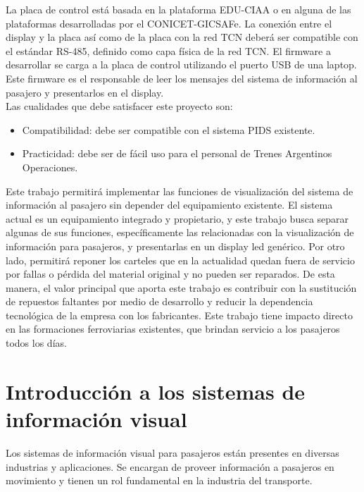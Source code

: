 La placa de control está basada en la plataforma EDU-CIAA \citep{proyecto-ciaa} o en alguna de las plataformas desarrolladas por el CONICET-GICSAFe. La conexión entre el display y la placa así como de la placa con la red TCN deberá ser compatible con el estándar RS-485, definido como capa física de la red TCN. El
firmware a desarrollar se carga a la placa de control utilizando el puerto USB de una laptop. Este firmware es el responsable de leer los mensajes del sistema de información al pasajero y presentarlos en el display.\\

Las cualidades que debe satisfacer este proyecto son:
\begin{itemize}
\item Compatibilidad: debe ser compatible con el sistema PIDS existente.
\item Practicidad: debe ser de fácil uso para el personal de Trenes Argentinos Operaciones.
\end{itemize}

Este trabajo permitirá implementar las funciones de visualización del sistema de información al pasajero sin depender del equipamiento existente. El sistema actual es un equipamiento integrado y propietario, y este trabajo busca separar algunas de sus funciones, específicamente las relacionadas con la visualización de información para pasajeros, y presentarlas en un display led genérico. Por otro lado, permitirá reponer los carteles que en la actualidad quedan fuera de servicio por fallas o pérdida del material original y no pueden ser reparados. De esta manera, el valor principal que aporta este trabajo es contribuir con la sustitución de repuestos faltantes por medio de desarrollo y reducir la dependencia tecnológica de la empresa con los fabricantes. Este trabajo tiene impacto directo en las formaciones ferroviarias existentes, que brindan servicio a los pasajeros todos los días.\\

\section{Introducción a los sistemas de información visual}

Los sistemas de información visual para pasajeros están presentes en diversas industrias y aplicaciones. Se encargan de proveer información a pasajeros en  movimiento y tienen un rol fundamental en la industria del transporte.\\


